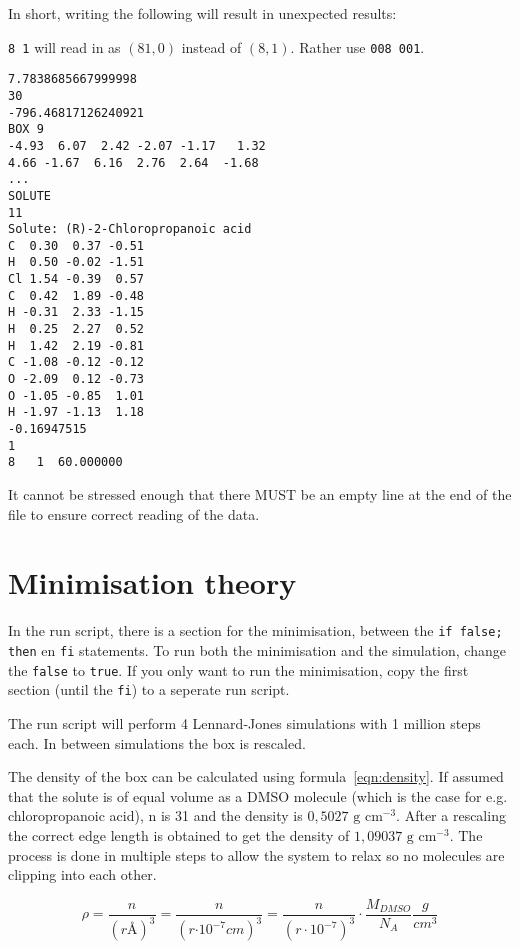 In short, writing the following will result in unexpected results:

\verb|8 1| will read in as $(81, 0)$ instead of $(8, 1)$. Rather use 
\verb|008 001|.

\begin{lstlisting}[caption=Example of a correct box-file]
7.7838685667999998     
30
-796.46817126240921     
BOX 9
-4.93  6.07  2.42 -2.07 -1.17   1.32     
4.66 -1.67  6.16  2.76  2.64  -1.68     
...     
SOLUTE
11
Solute: (R)-2-Chloropropanoic acid
C  0.30  0.37 -0.51
H  0.50 -0.02 -1.51
Cl 1.54 -0.39  0.57
C  0.42  1.89 -0.48
H -0.31  2.33 -1.15
H  0.25  2.27  0.52
H  1.42  2.19 -0.81
C -1.08 -0.12 -0.12
O -2.09  0.12 -0.73
O -1.05 -0.85  1.01
H -1.97 -1.13  1.18
-0.16947515     
1
8   1  60.000000

\end{lstlisting}

It cannot be stressed enough that there MUST be an empty line at the end of the 
file to ensure correct reading of the data.

\section{Minimisation theory}
In the run script, there is a section for the minimisation, between the 
\verb|if false; then| en \verb|fi| statements. To run both the minimisation and 
the simulation, change the \verb|false| to \verb|true|. If you only want to run 
the minimisation, copy the first section (until the \verb|fi|) to a seperate 
run script.

The run script will perform 4 Lennard-Jones simulations with 1 million steps 
each. In between simulations the box is rescaled.

The density of the box can be calculated using formula~\ref{eqn:density}. If 
assumed that the solute is of equal volume as a DMSO molecule (which is the 
case for e.g. chloropropanoic acid), n is 31 and the density is $0,5027 
\textrm{ g cm}^{-3}$. After a rescaling the correct edge length is obtained to 
get the density of $1,09037 \textrm{ g cm}^{-3}$.\cite{Radhamma2008}
The process is done in multiple steps to allow the system to relax so no 
molecules are clipping into each other.

\begin{equation} \label{eqn:density}
\rho = \dfrac{n}{(r \si{\angstrom})^3} = \dfrac{n}{(r \si{\cdot 10^{-7} cm})^3} 
=
\dfrac{n}{(r \cdot 10^{-7})^3} \cdot \dfrac{M_{DMSO}}{N_A} \dfrac{g}{cm^3}
\end{equation}

